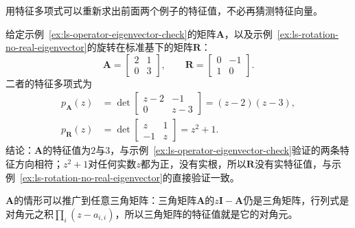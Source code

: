 用特征多项式可以重新求出前面两个例子的特征值，不必再猜测特征向量。
\begin{example}[用特征多项式求特征值]
\label{ex:ls-characteristic-polynomial-two-by-two}
给定示例~\ref{ex:ls-operator-eigenvector-check}的矩阵$\bm A$，以及示例~\ref{ex:ls-rotation-no-real-eigenvector}的旋转在标准基下的矩阵$\bm R$：
\[
 \bm A=\begin{bmatrix}2&1\\0&3\end{bmatrix},\qquad
 \bm R=\begin{bmatrix}0&-1\\1&0\end{bmatrix}.
\]
二者的特征多项式为
\[
 \begin{aligned}
 p_{\bm A}(z)&=\det\begin{bmatrix}z-2&-1\\0&z-3\end{bmatrix}=(z-2)(z-3),\\
 p_{\bm R}(z)&=\det\begin{bmatrix}z&1\\-1&z\end{bmatrix}=z^2+1 .
 \end{aligned}
\]
结论：$\bm A$的特征值为$2$与$3$，与示例~\ref{ex:ls-operator-eigenvector-check}验证的两条特征方向相符；$z^2+1$对任何实数$z$都为正，没有实根，所以$\bm R$没有实特征值，与示例~\ref{ex:ls-rotation-no-real-eigenvector}的直接验证一致。
\end{example}
$\bm A$的情形可以推广到任意三角矩阵：三角矩阵$\bm A$的$z\bm I-\bm A$仍是三角矩阵，行列式是对角元之积$\prod_i(z-a_{i,i})$，所以三角矩阵的特征值就是它的对角元。

